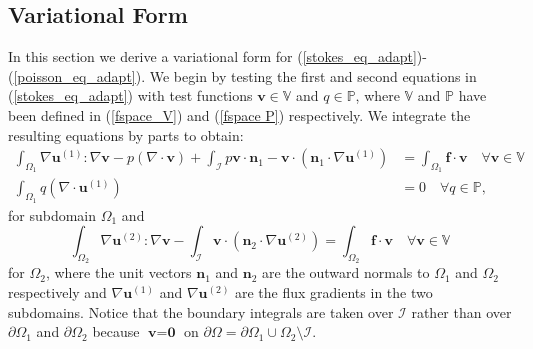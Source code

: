 \documentclass[12pt,a4paper]{article}
\theoremstyle{definition}
\begin{document}
\subsection{Variational Form}
In this section we derive a variational form for (\ref{stokes_eq_adapt})-(\ref{poisson_eq_adapt}).  We begin by testing the first and second equations in  (\ref{stokes_eq_adapt}) with test functions $\textbf{v}\in \mathbb{V}$ and $q\in \mathbb{P}$, where  $\mathbb{V}$ and $\mathbb{P}$ have been defined in (\ref{fspace_V}) and (\ref{fspace P}) respectively. We integrate the resulting equations by parts to obtain:
\begin{equation}\label{weak_stokes_1}
\begin{aligned}
\int_{\Omega_1}\nabla \textbf{u}^{\left(1\right)} : \nabla \textbf{v}-p\left(\nabla \cdot \textbf{v}\right) +\int_{\mathcal{I}} p\textbf{v}\cdot \textbf{n}_1-\textbf{v}\cdot\left(\textbf{n}_1\cdot\nabla\textbf{u}^{\left(1\right)}\right) &=\int_{\Omega_1}\textbf{f}\cdot \textbf{v}  \quad \forall  \textbf{v}\in \mathbb{V}\\
\int_{\Omega_1}q\left(\nabla \cdot \textbf{u}^{\left(1\right)}\right) &= 0\quad \forall q\in \mathbb{P},
\end{aligned}
\end{equation}
for subdomain $\Omega_1$ and
\begin{equation}\label{weak_poisson}
\int_{\Omega_2}\nabla \textbf{u}^{\left(2\right)} : \nabla \textbf{v} - \int_{\mathcal{I}} \textbf{v}\cdot\left(\textbf{n}_2\cdot\nabla\textbf{u}^{\left(2\right)}\right)= \int_{\Omega_2}\textbf{f}\cdot \textbf{v}  \quad \forall  \textbf{v}\in \mathbb{V}
\end{equation}
for $\Omega_2$, where the unit vectors $\textbf{n}_1$ and $\textbf{n}_2$ are the outward normals to $\Omega_{1}$ and $\Omega_{2}$ respectively and $\nabla \textbf{u}^{\left(1\right)}$ and $\nabla \textbf{u}^{\left(2\right)}$ are the flux gradients in the two subdomains. Notice that the boundary integrals are taken over $\mathcal{I}$ rather than over $\partial \Omega_{1}$ and $\partial \Omega_{2}$ because $\textbf{v}=\textbf{0}$ on $ \partial \Omega = \partial \Omega_1\cup \Omega_{2}\setminus \mathcal{I}$.   
\end{document}
